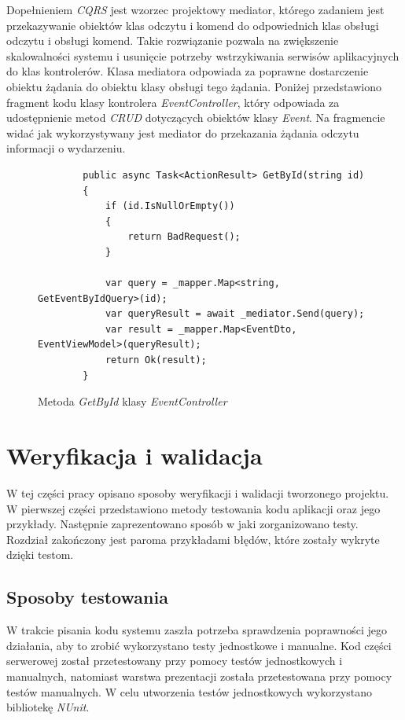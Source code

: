 \documentclass[a4paper,twoside,12pt]{book}
\begin{document}
Dopełnieniem \textit{CQRS} jest wzorzec projektowy mediator, którego zadaniem jest przekazywanie obiektów klas odczytu i komend do odpowiednich klas obsługi odczytu i obsługi komend. Takie rozwiązanie pozwala na zwiększenie skalowalności systemu i usunięcie potrzeby wstrzykiwania serwisów aplikacyjnych do klas kontrolerów. Klasa mediatora odpowiada za poprawne dostarczenie obiektu żądania do obiektu klasy obsługi tego żądania. Poniżej przedstawiono fragment kodu klasy kontrolera \textit{EventController}, który odpowiada za udostępnienie metod \textit{CRUD} dotyczących obiektów klasy \textit{Event}. Na fragmencie widać jak wykorzystywany jest mediator do przekazania żądania odczytu informacji o wydarzeniu.
\begin{figure} [H]
	\centering
	\begin{lstlisting}
        public async Task<ActionResult> GetById(string id)
		{
			if (id.IsNullOrEmpty())
			{
				return BadRequest();
			}
			
			var query = _mapper.Map<string, GetEventByIdQuery>(id);
			var queryResult = await _mediator.Send(query);
			var result = _mapper.Map<EventDto, EventViewModel>(queryResult);
			return Ok(result);
		}
	\end{lstlisting}
	\caption{Metoda \textit{GetById} klasy \textit{EventController}}
	\label{fig:mediator}
\end{figure}

\chapter{Weryfikacja i walidacja}
W tej części pracy opisano sposoby weryfikacji i walidacji tworzonego projektu. W pierwszej części przedstawiono metody testowania kodu aplikacji oraz jego przykłady. Następnie zaprezentowano sposób w jaki zorganizowano testy. Rozdział zakończony jest paroma przykładami błędów, które zostały wykryte dzięki testom.

\section{Sposoby testowania}
W trakcie pisania kodu systemu zaszła potrzeba sprawdzenia poprawności jego działania, aby to zrobić wykorzystano testy jednostkowe i manualne. Kod części serwerowej został przetestowany przy pomocy testów jednostkowych i manualnych, natomiast warstwa prezentacji została przetestowana przy pomocy testów manualnych. W celu utworzenia testów jednostkowych wykorzystano bibliotekę \textit{NUnit}.
\end{document}

